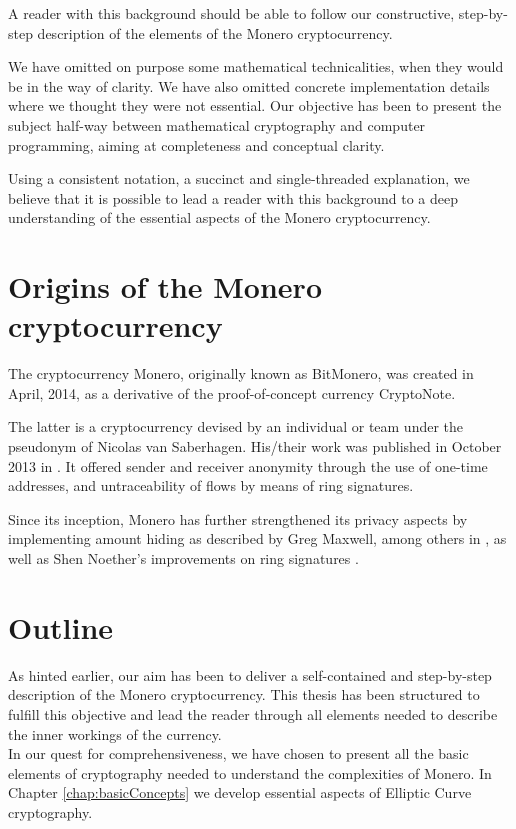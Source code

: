 A reader with this background should be able to follow our constructive, step-by-step description of the elements of the Monero cryptocurrency.

We have omitted on purpose some mathematical technicalities, when they would be in the way of clarity.
We have also omitted concrete implementation details where we thought they were not essential.
Our objective has been to present the subject half-way between mathematical cryptography and 
computer programming, aiming at completeness and conceptual clarity.

Using a consistent
notation, a succinct and single-threaded explanation, 
we believe that it is possible to lead a reader with this background to a deep understanding
of the essential aspects of the Monero cryptocurrency.  


\section{Origins of the Monero cryptocurrency}

The cryptocurrency Monero, originally known as BitMonero, was created in April, 2014, as a derivative of the proof-of-concept currency CryptoNote.

The latter is a cryptocurrency devised by an individual or team under the pseudonym of Nicolas van Saberhagen. His/their work was published in October 2013 in \cite{cryptoNoteWhitePaper}.
It offered sender and receiver anonymity through the use of one-time addresses, and untraceability of flows
by means of ring signatures.

Since its inception, Monero has further strengthened its privacy aspects by implementing amount hiding as described by
Greg Maxwell, among others in \cite{Signatures2015BorromeanRS}, as well as Shen Noether's improvements
on ring signatures \cite{ledger34}.
  

\section{Outline}

As hinted earlier, our aim has been to deliver a self-contained and step-by-step description of the Monero
cryptocurrency. This thesis has been structured to fulfill this objective and
lead the reader through all elements needed to describe the inner workings of the currency.
\\

In our quest for comprehensiveness, we have chosen to present all the basic elements of cryptography
needed to understand the complexities of Monero. In Chapter \ref{chap:basicConcepts} we develop essential
aspects of Elliptic Curve cryptography.

